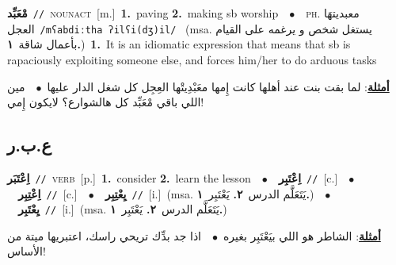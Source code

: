 \documentclass[10pt,a4paper,twoside]{article} %
\begin{document}
\begin{multicols}{2}
{\setlength\topsep{0pt}\textbf{\foreignlanguage{arabic}{مْعَبِّد}}\ {\color{gray}\texttt{//}\color{black}}\ \textsc{noun\textunderscore act}\ [m.]\ \textbf{1.}~paving  \textbf{2.}~making sb worship\ \ $\bullet$\ \ \textsc{ph.} \color{gray} \foreignlanguage{arabic}{معبديتهَا العجل}\color{black}\ {\color{gray}\texttt{/{\sffamily mʕabdiːtha ʔilʕi(dʒ)il}/}\color{black}}\ \color{gray} (msa. \foreignlanguage{arabic}{يستغل شخص و يرغمه على القيام بأعمال شاقة}~\foreignlanguage{arabic}{\textbf{١.}})\color{black}\ \textbf{1.}~It is an idiomatic expression that means that sb is rapaciously exploiting someone else, and forces him/her to do arduous tasks\  \begin{flushright}\color{gray}\foreignlanguage{arabic}{\textbf{\underline{\foreignlanguage{arabic}{أمثلة}}}: لما بقت بنت عند أهلها كانت إِمها معَبْدِيتْها العِجِل كل شغل الدار عليها\ $\bullet$\ \  مين اللي باقي مْعَبِّد كل هالشوارع؟ لايكون إِمي!}\end{flushright}\color{black}} \vspace{2mm}

\vspace{-3mm}
\subsection*{\color{blue}\foreignlanguage{arabic}{ع.ب.ر}\color{blue}{}} 

{\setlength\topsep{0pt}\textbf{\foreignlanguage{arabic}{اِعْتَبَر}}\ {\color{gray}\texttt{//}\color{black}}\ \textsc{verb}\ [p.]\ \textbf{1.}~consider  \textbf{2.}~learn the lesson\ \ $\bullet$\ \ \setlength\topsep{0pt}\textbf{\foreignlanguage{arabic}{اِعْتَبِر}}\ {\color{gray}\texttt{//}\color{black}}\ [c.]\ \ $\bullet$\ \ \setlength\topsep{0pt}\textbf{\foreignlanguage{arabic}{اِعْتِبِر}}\ {\color{gray}\texttt{//}\color{black}}\ [c.]\ \ $\bullet$\ \ \setlength\topsep{0pt}\textbf{\foreignlanguage{arabic}{يِعْتِبِر}}\ {\color{gray}\texttt{//}\color{black}}\ [i.]\ \color{gray}(msa. \foreignlanguage{arabic}{يَتَعَلَّم الدرس}~\foreignlanguage{arabic}{\textbf{٢.}}  \foreignlanguage{arabic}{يَعْتَبِر}~\foreignlanguage{arabic}{\textbf{١.}})\color{black}\ \ $\bullet$\ \ \setlength\topsep{0pt}\textbf{\foreignlanguage{arabic}{يِعْتَبِر}}\ {\color{gray}\texttt{//}\color{black}}\ [i.]\ \color{gray}(msa. \foreignlanguage{arabic}{يَتَعَلَّم الدرس}~\foreignlanguage{arabic}{\textbf{٢.}}  \foreignlanguage{arabic}{يَعْتَبِر}~\foreignlanguage{arabic}{\textbf{١.}})\color{black}\  \begin{flushright}\color{gray}\foreignlanguage{arabic}{\textbf{\underline{\foreignlanguage{arabic}{أمثلة}}}: الشاطر هو اللي بيَعْتَبِر بغيره\ $\bullet$\ \  اذا جد بدِّك تريحي راسك، اعتبريها ميتة من الأساس!}\end{flushright}\color{black}} \vspace{2mm}


\end{multicols}
\end{document}
